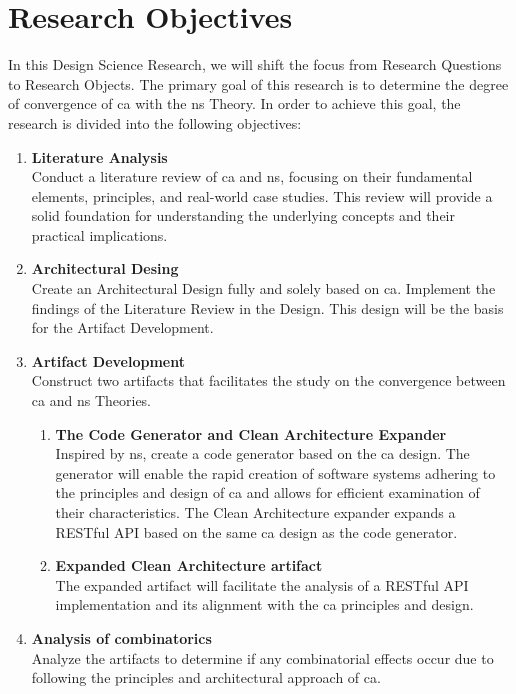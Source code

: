 \section{Research Objectives} \label{sec_research_objectives}

In this Design Science Research, we will shift the focus from Research Questions to
Research Objects. The primary goal of this research is to determine the degree of
convergence of \gls{ca} with the \gls{ns} Theory. In order to achieve this goal, the
research is divided into the following objectives:

\begin{enumerate}
    \item \textbf{Literature Analysis} \\
    Conduct a literature review of \gls{ca} and \gls{ns}, focusing on their
    fundamental elements, principles, and real-world case studies. This review will
    provide a solid foundation for understanding the underlying concepts and their
    practical implications.
    
    \item \textbf{Architectural Desing} \\
    Create an Architectural Design fully and solely based on \gls{ca}. Implement the
    findings of the Literature Review in the Design. This design will be the basis for
    the Artifact Development.

    \item \textbf{Artifact Development} \\
    Construct two artifacts that facilitates the study on the convergence
    between \gls{ca} and \gls{ns} Theories.
    \begin{enumerate}[label*={\arabic*.}]
        
        \item \textbf{The Code Generator and Clean Architecture Expander} \\
        Inspired by \gls{ns}, create a code generator based on the \gls{ca} design. The
        generator will enable the rapid creation of software systems adhering to the
        principles and design of \gls{ca} and allows for efficient examination of their
        characteristics. The Clean Architecture expander expands a RESTful API based on
        the same \gls{ca} design as the code generator. 
        
        \item \textbf{Expanded Clean Architecture artifact} \\
        The expanded artifact will facilitate the analysis of a RESTful API implementation
        and its alignment with the \gls{ca} principles and design.
        
    \end{enumerate}
    
    \item \textbf{Analysis of combinatorics} \\
    Analyze the artifacts to determine if any combinatorial effects occur due to following
    the principles and architectural approach of \gls{ca}.
\end{enumerate}
